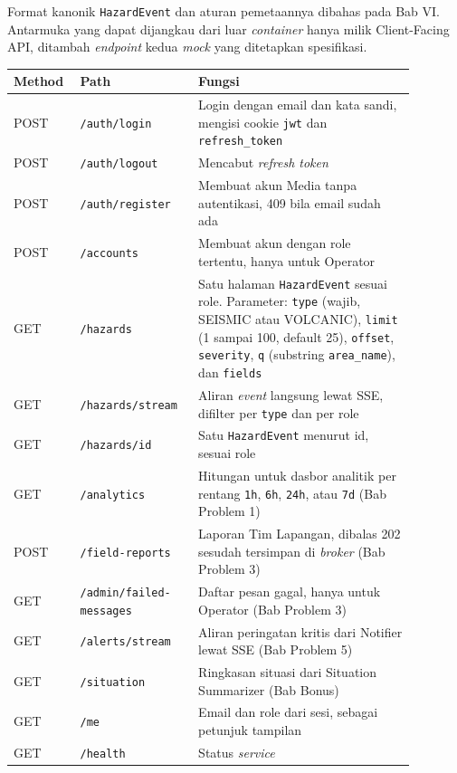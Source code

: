 Format kanonik \texttt{HazardEvent} dan aturan pemetaannya dibahas pada Bab VI. Antarmuka yang dapat dijangkau dari luar \textit{container} hanya milik Client-Facing API, ditambah \textit{endpoint} kedua \textit{mock} yang ditetapkan spesifikasi.

\begin{longtable}[]{|>{\raggedright\arraybackslash}p{0.12\linewidth}|>{\raggedright\arraybackslash}p{0.26\linewidth}|>{\raggedright\arraybackslash}p{0.5\linewidth}|}
\hline
Method & Path & Fungsi \\
\hline
\endhead
POST & \texttt{/auth/login} & Login dengan email dan kata sandi, mengisi cookie \texttt{jwt} dan \texttt{refresh\_token} \\
\hline
POST & \texttt{/auth/logout} & Mencabut \textit{refresh token} \\
\hline
POST & \texttt{/auth/register} & Membuat akun Media tanpa autentikasi, 409 bila email sudah ada \\
\hline
POST & \texttt{/accounts} & Membuat akun dengan role tertentu, hanya untuk Operator \\
\hline
GET & \texttt{/hazards} & Satu halaman \texttt{HazardEvent} sesuai role. Parameter: \texttt{type} (wajib, SEISMIC atau VOLCANIC), \texttt{limit} (1 sampai 100, default 25), \texttt{offset}, \texttt{severity}, \texttt{q} (substring \texttt{area\_name}), dan \texttt{fields} \\
\hline
GET & \texttt{/hazards/stream} & Aliran \textit{event} langsung lewat SSE, difilter per \texttt{type} dan per role \\
\hline
GET & \texttt{/hazards/{id}} & Satu \texttt{HazardEvent} menurut id, sesuai role \\
\hline
GET & \texttt{/analytics} & Hitungan untuk dasbor analitik per rentang \texttt{1h}, \texttt{6h}, \texttt{24h}, atau \texttt{7d} (Bab Problem 1) \\
\hline
POST & \texttt{/field-reports} & Laporan Tim Lapangan, dibalas 202 sesudah tersimpan di \textit{broker} (Bab Problem 3) \\
\hline
GET & \texttt{/admin/failed-messages} & Daftar pesan gagal, hanya untuk Operator (Bab Problem 3) \\
\hline
GET & \texttt{/alerts/stream} & Aliran peringatan kritis dari Notifier lewat SSE (Bab Problem 5) \\
\hline
GET & \texttt{/situation} & Ringkasan situasi dari Situation Summarizer (Bab Bonus) \\
\hline
GET & \texttt{/me} & Email dan role dari sesi, sebagai petunjuk tampilan \\
\hline
GET & \texttt{/health} & Status \textit{service} \\
\hline
\end{longtable}

